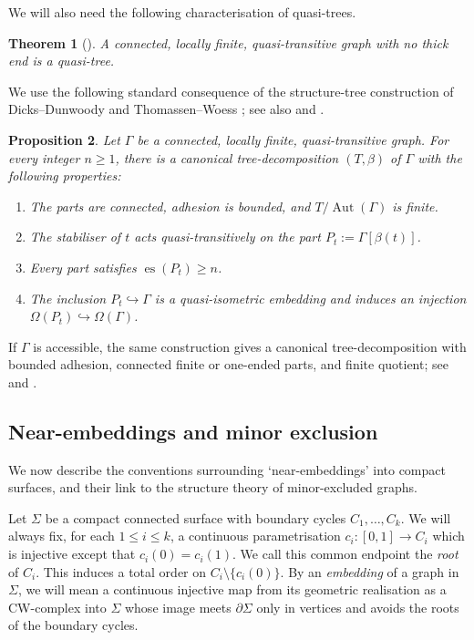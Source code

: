 \documentclass[10pt,a4paper]{amsart}
\newtheorem{theorem}{Theorem}[section]%
\newtheorem{proposition}[theorem]{Proposition}
\theoremstyle{definition}
\begin{document}
We will also need the following characterisation of quasi-trees. 

\begin{theorem}[{\cite[Thm.~5.5]{KM08}}]\label{lem:thin-ended-almost-planar}
A connected, locally finite, quasi-transitive graph with no thick end is a quasi-tree.
\end{theorem}

We use the following standard consequence of the structure-tree construction of Dicks--Dunwoody \cite[Thm.~II.2.20]{dicks1989groups} and Thomassen--Woess \cite[Sec.~7]{thomassen1993vertex}; see also \cite[Sec.~4]{hamann2022stallings} and \cite[Thm.~2.15]{macmanus2023accessibility}.

\begin{proposition}\label{prop:highly-connected-parts}
Let $\Gamma$ be a connected, locally finite, quasi-transitive graph.
For every integer $n\geq1$, there is a canonical tree-decomposition $(T,\beta)$ of $\Gamma$ with the following properties:
\begin{enumerate}
\item The parts are connected, adhesion is bounded, and $T/\operatorname{Aut}(\Gamma)$ is finite.
\item The stabiliser of $t$ acts quasi-transitively on the part $P_t:=\Gamma[\beta(t)]$.
\item Every part satisfies $\operatorname{es}(P_t)\geq n$.
\item The inclusion $P_t\hookrightarrow\Gamma$ is a quasi-isometric embedding and induces an injection $\Omega(P_t)\hookrightarrow\Omega(\Gamma)$.
\end{enumerate}
\end{proposition}

If $\Gamma$ is accessible, the same construction gives a canonical tree-decomposition with bounded adhesion, connected finite or one-ended parts, and finite quotient; see \cite[Sec.~7]{thomassen1993vertex} and \cite[Thm.~6.4, Prop.~4.1]{hamann2022stallings}.

\subsection{Near-embeddings and minor exclusion}\label{subsec:near-embeddings}

We now describe the conventions surrounding `near-embeddings' into compact surfaces, and their link to the structure theory of minor-excluded graphs.

Let $\Sigma$ be a compact connected surface with boundary cycles $C_1,\ldots,C_k$.
We will always fix, for each $1 \leq i \leq k$, a continuous parametrisation $c_i:[0,1]\to C_i$ which is injective except that $c_i(0)=c_i(1)$.
We call this common endpoint the \emph{root} of $C_i$. This induces a total order on $C_i\setminus\{c_i(0)\}$.
By an \emph{embedding} of a graph in $\Sigma$, we will mean a continuous injective map from its geometric realisation as a CW-complex into $\Sigma$ whose image meets $\partial\Sigma$ only in vertices and avoids the roots of the boundary cycles.
\end{document}
